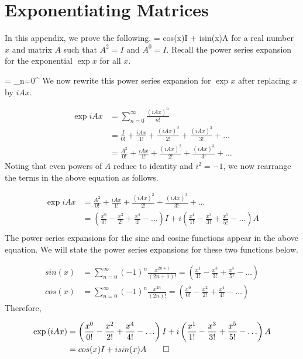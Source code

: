 \chapter{Exponentiating Matrices\label{ch:expmtx}}

In this appendix, we prove the following.
\beq
{} = cos(x)I + isin(x)A
\eeq
for a real number $x$ and matrix $A$ such that $A^2 = I$ and $A^0 = I$. Recall the power series expansion for the exponential $\exp{x}$ for all $x$.

\beq
{} = \sum\limits_{n=0}^{\infty} 
\eeq
We now rewrite this power series expansion for $\exp{x}$ after replacing $x$ by $iAx$.

\begin{align}
\exp{iAx} &= \sum\limits_{n=0}^{\infty}\frac{\left(iAx\right)^n}{n!}\\
&= \frac{I}{0!} + \frac{iAx}{1!} + \frac{\left(iAx\right)^2}{2!} + \frac{\left(iAx\right)^3}{3!} + \ldots\\
&= \frac{A^2}{0!} + \frac{iAx}{1!} + \frac{\left(iAx\right)^2}{2!} + \frac{\left(iAx\right)^3}{3!} + \ldots
\end{align}
Noting that even powers of $A$ reduce to identity and $i^2 = -1$, we now rearrange the terms in the above equation as follows.

\begin{align}
\exp{iAx} &= \frac{A^2}{0!} + \frac{iAx}{1!} + \frac{\left(iAx\right)^2}{2!} + \frac{\left(iAx\right)^3}{3!} + \ldots\\
&= \left(\frac{x^0}{0!} - \frac{x^2}{2!} + \frac{x^4}{4!} - \ldots \right)I + i\left(\frac{x^1}{1!} - \frac{x^3}{3!} + \frac{x^5}{5!} - \ldots \right)A\\
\end{align}
The power series expansions for the sine and cosine functions appear in the above equation. We will state the power series expansions for these two functions below.

\begin{align}
sin(x) &= \sum\limits_{n=0}^{\infty} \left(-1\right)^n\frac{x^{2n+1}}{\left(2n+1\right)!} = \left(\frac{x^1}{1!} - \frac{x^3}{3!} + \frac{x^5}{5!} - \ldots \right)\\
cos(x) &= \sum\limits_{n=0}^{\infty} \left(-1\right)^n\frac{x^{2n}}{\left(2n\right)!} = \left(\frac{x^0}{0!} - \frac{x^2}{2!} + \frac{x^4}{4!} - \ldots \right)
\end{align}
Therefore,

\begin{align}
\exp{iAx} &= \left(\frac{x^0}{0!} - \frac{x^2}{2!} + \frac{x^4}{4!} - \ldots \right)I + i\left(\frac{x^1}{1!} - \frac{x^3}{3!} + \frac{x^5}{5!} - \ldots \right)A\\
&= cos(x)I + isin(x)A\qed
\end{align}

